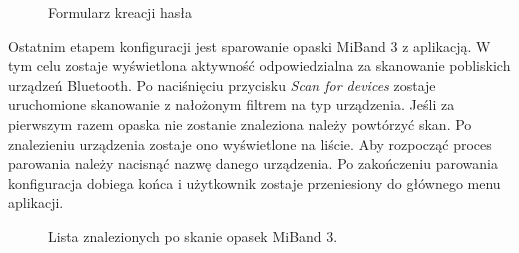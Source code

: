 \begin{figure}[H]
    \begin{center}
        \setlength{\fboxsep}{0pt}%
        \setlength{\fboxrule}{0.3pt}%
    \end{center}
    \caption{{\color{dgray}Formularz kreacji hasła}} \label{setPassword}
\end{figure}
Ostatnim etapem konfiguracji jest sparowanie opaski MiBand 3 z aplikacją. W tym celu zostaje wyświetlona aktywność odpowiedzialna za skanowanie pobliskich urządzeń Bluetooth. Po naciśnięciu przycisku \textit{Scan for devices} zostaje uruchomione skanowanie z nałożonym filtrem na typ urządzenia. Jeśli za pierwszym razem opaska nie zostanie znaleziona należy powtórzyć skan. Po znalezieniu urządzenia zostaje ono wyświetlone na liście. Aby rozpocząć proces parowania należy nacisnąć nazwę danego urządzenia. Po zakończeniu parowania konfiguracja dobiega końca i użytkownik zostaje przeniesiony do głównego menu aplikacji.
\begin{figure}[H]
    \begin{center}
        \setlength{\fboxsep}{0pt}%
        \setlength{\fboxrule}{0.3pt}%
    \end{center}
    \caption{{\color{dgray}Lista znalezionych po skanie opasek MiBand 3.}} \label{afterScan}
\end{figure}
